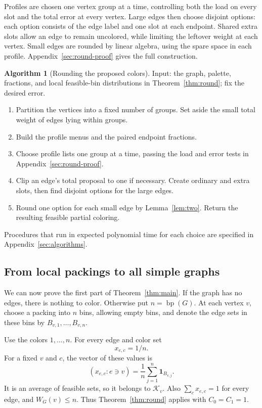 \documentclass[11pt]{article}
\theoremstyle{definition}\newtheorem{algorithm}{Algorithm}[section]
\numberwithin{equation}{section}
\theoremstyle{remark}\newtheorem*{remark}{Remark}
\newcommand{\bp}{\operatorname{bp}}
\newcommand{\one}{\mathbf 1}
\begin{document}
Profiles are chosen one vertex group at a time, controlling both the
load on every slot and the total error at every vertex. Large edges then
choose disjoint options: each option consists of the edge label and one
slot at each endpoint. Shared extra slots allow an edge to remain
uncolored, while limiting the leftover weight at each vertex. Small edges
are rounded by linear algebra, using the spare space in each profile.
Appendix~\ref{sec:round-proof} gives the full construction.

\begin{algorithm}[Rounding the proposed colors]\label{alg:round}
Input: the graph, palette, fractions, and local feasible-bin distributions
in Theorem~\ref{thm:round}; fix the desired error.
\begin{enumerate}[leftmargin=*,nosep]
\item Partition the vertices into a fixed number of groups. Set aside
the small total weight of edges lying within groups.
\item Build the profile menus and the paired endpoint fractions.
\item Choose profile lists one group at a time, passing the load and
error tests in Appendix~\ref{sec:round-proof}.
\item Clip an edge's total proposal to one if necessary. Create ordinary
and extra slots, then find disjoint options for the large edges.
\item Round one option for each small edge by Lemma~\ref{lem:two}.
Return the resulting feasible partial coloring.
\end{enumerate}
Procedures that run in expected polynomial time for each choice are specified in
Appendix~\ref{sec:algorithms}.
\end{algorithm}

\subsection{From local packings to all simple graphs}\label{sec:simple}
We can now prove the first part of Theorem~\ref{thm:main}. If the graph
has no edges, there is nothing to color. Otherwise put $n=\bp(G)$.
At each vertex $v$, choose a packing into $n$ bins, allowing empty bins,
and denote the edge sets in these bins by $B_{v,1},\ldots,B_{v,n}$.

Use the colors $1,\ldots,n$. For every edge and color set
\[
 x_{e,c}=1/n.
\]
For a fixed $v$ and $c$, the vector of these values is
\[
 (x_{e,c}:e\ni v)=\frac1n\sum_{j=1}^n\one_{B_{v,j}}.
\]
It is an average of feasible sets, so it belongs to $\mathcal K_v$.
Also $\sum_cx_{e,c}=1$ for every edge, and $W_G(v)\le n$. Thus
Theorem~\ref{thm:round} applies with $C_0=C_1=1$.
\end{document}
